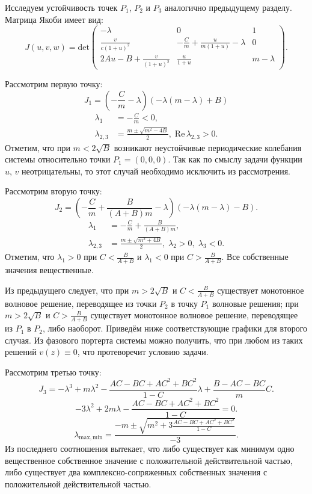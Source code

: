 \documentclass[a4paper, 11pt]{article}
\begin{document}
	Исследуем устойчивость точек $P_1$, $P_2$ и $P_3$ аналогично предыдущему разделу. Матрица Якоби имеет вид:
	$$
		J(u,v,w) = \mathrm{det}\begin{pmatrix}
			-\lambda & 0 & 1 \\
			\frac{v}{c(1 + u)^2} & -\frac{C}{m} + \frac{u}{m(1+u)} -\lambda & 0 \\
			2Au - B + \frac{v}{(1+u)^2} & \frac{u}{1+u} & m -\lambda
		\end{pmatrix}.
	$$

	Рассмотрим первую точку:
	$$
		J_1 = \left(-\frac{C}{m} - \lambda\right)\left( -\lambda(m - \lambda) + B\right)
	$$
	$$
		\begin{aligned}
			\lambda_1 &= -\frac{C}{m} < 0, \\
			\lambda_{2,3} &= \frac{m \pm \sqrt{m^2 - 4B}}{2},\; \mathrm{Re}\,\lambda_{2,3} > 0.
		\end{aligned}
	$$
	Отметим, что при $m < 2\sqrt{B}$ возникают неустойчивые периодические колебания системы относительно точки $P_1 = (0,0,0)$. Так как по смыслу задачи функции $u$, $v$ неотрицательны, то этот случай необходимо исключить из рассмотрения.

	Рассмотрим вторую точку:
	$$
		J_2 = \left(-\frac{C}{m} + \frac{B}{(A+B)m} - \lambda\right)\left(-\lambda(m - \lambda)-B\right).
	$$
	$$
		\begin{aligned}
			\lambda_1 &= -\frac{C}{m} + \frac{B}{(A+B)m},\\
			\lambda_{2,3} &= \frac{m \pm \sqrt{m^2 + 4B}}{2},\; \lambda_2 > 0,\; \lambda_3 < 0.
		\end{aligned}
	$$
	Отметим, что $\lambda_1 > 0$ при $C < \frac{B}{A+B}$ и $\lambda_1 < 0$ при $C > \frac{B}{A+B}$. Все собственные значения вещественные.

	Из предыдущего следует, что при $m > 2\sqrt{B}$ и $C < \frac{B}{A+B}$ существует монотонное волновое решение, переводящее из точки $P_2$ в точку $P_1$ волновые решения; при $m > 2\sqrt{B}$ и $C > \frac{B}{A+B}$ существует монотонное волновое решение, переводящее из $P_1$ в $P_2$, либо наоборот. Приведём ниже соответствующие графики для второго случая. Из фазового портерта системы можно получить, что при любом из таких решений $v(z) \equiv 0$, что протеворечит условию задачи.

	Рассмотрим третью точку:
	$$
		J_3 = -\lambda^3 +m\lambda^2 - \frac{AC - BC + AC^2 + BC^2}{1 - C}\lambda + \frac{B - AC - BC}{m}C.
	$$
	$$
		-3\lambda^2 +2m\lambda - \frac{AC - BC +AC^2 + BC^2}{1-C} = 0.
	$$
	$$
		\lambda_{\mathrm{max}, \mathrm{min}} = \frac{-m \pm \sqrt{m^2 + 3\frac{AC-BC+AC^2+BC^2}{1 - C}}}{-3}.
	$$
	Из последнего соотношения вытекает, что либо существует как минимум одно вещественное собственное значение с положительной действительной частью, либо существует два комплексно-сопряженных собственных значения с положительной действительной частью.
\end{document}
